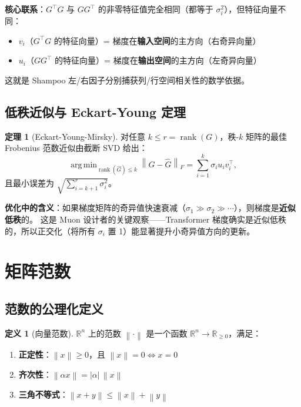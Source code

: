 \documentclass[12pt,a4paper]{ctexart}
\theoremstyle{definition}
\newtheorem{definition}{定义}[section]
\newtheorem{theorem}{定理}[section]
\theoremstyle{plain}
\newcommand{\R}{\mathbb{R}}
\newcommand{\norm}[1]{\left\lVert #1 \right\rVert}
\DeclareMathOperator*{\argmin}{arg\,min}
\DeclareMathOperator{\rank}{rank}
\begin{document}
\textbf{核心联系}：$G^\top G$ 与 $GG^\top$ 的非零特征值完全相同（都等于 $\sigma_i^2$），但特征向量不同：
\begin{itemize}
  \item $v_i$（$G^\top G$ 的特征向量）= 梯度在\textbf{输入空间}的主方向（右奇异向量）
  \item $u_i$（$GG^\top$ 的特征向量）= 梯度在\textbf{输出空间}的主方向（左奇异向量）
\end{itemize}
这就是 Shampoo 左/右因子分别捕获列/行空间相关性的数学依据。

\subsection{低秩近似与 Eckart-Young 定理}

\begin{theorem}[Eckart-Young-Mirsky]
  对任意 $k\le r=\rank(G)$，秩-$k$ 矩阵的最佳 Frobenius 范数近似由截断 SVD 给出：
  \begin{equation}
    \argmin_{\rank(\hat G)\le k} \norm{G-\hat G}_F = \sum_{i=1}^k \sigma_i u_i v_i^\top,
  \end{equation}
  且最小误差为 $\sqrt{\sum_{i=k+1}^r \sigma_i^2}$。
\end{theorem}

\textbf{优化中的含义}：如果梯度矩阵的奇异值快速衰减（$\sigma_1\gg\sigma_2\gg\cdots$），则梯度是\textbf{近似低秩}的。
这是 Muon 设计者的关键观察——Transformer 梯度确实是近似低秩的，所以正交化（将所有 $\sigma_i$ 置 1）能显著提升小奇异值方向的更新。

\section{矩阵范数}

\subsection{范数的公理化定义}

\begin{definition}[向量范数]
  $\R^n$ 上的范数 $\norm{\cdot}$ 是一个函数 $\R^n\to\R_{\ge0}$，满足：
  \begin{enumerate}[label=(\arabic*)]
    \item \textbf{正定性}：$\norm{x}\ge0$，且 $\norm{x}=0\iff x=0$
    \item \textbf{齐次性}：$\norm{\alpha x}=|\alpha|\,\norm{x}$
    \item \textbf{三角不等式}：$\norm{x+y}\le\norm{x}+\norm{y}$
  \end{enumerate}
\end{definition}
\end{document}
